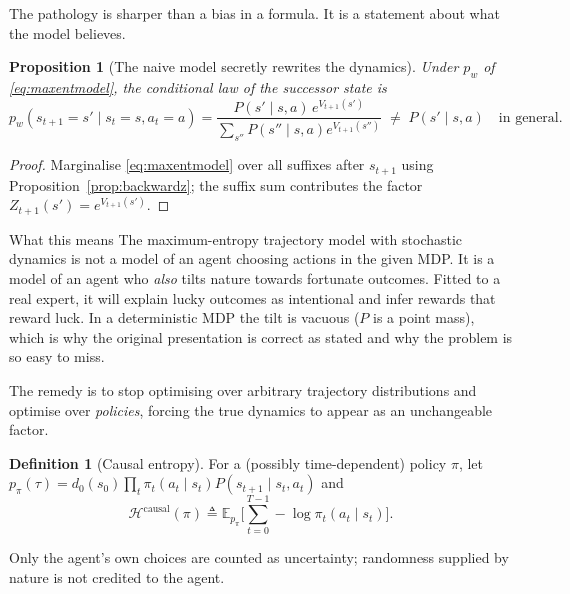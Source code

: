 \documentclass[11pt]{article}
\theoremstyle{plain}
\newtheorem{proposition}[theorem]{Proposition}
\theoremstyle{definition}
\newtheorem{definition}[theorem]{Definition}
\theoremstyle{remark}
\newcommand{\E}{\mathbb{E}}
\begin{document}
The pathology is sharper than a bias in a formula. It is a statement about
what the model believes.

\begin{proposition}[The naive model secretly rewrites the
dynamics]\label{prop:naivetrap}
Under $p_w$ of \eqref{eq:maxentmodel}, the conditional law of the
successor state is
\begin{equation}
p_w(s_{t+1}=s' \mid s_t=s, a_t=a) = \frac{P(s'\mid s,a)\,e^{V_{t+1}(s')}}
{\sum_{s''}P(s''\mid s,a)e^{V_{t+1}(s'')}} \;\ne\; P(s'\mid s,a) \quad
\text{in general.}
\label{eq:naivetrap}
\end{equation}
\end{proposition}

\begin{proof}
Marginalise \eqref{eq:maxentmodel} over all suffixes after $s_{t+1}$ using
Proposition~\ref{prop:backwardz}; the suffix sum contributes the factor
$Z_{t+1}(s') = e^{V_{t+1}(s')}$.
\end{proof}

\begin{redbox}{What this means}
The maximum-entropy trajectory model with stochastic dynamics is not a
model of an agent choosing actions in the given MDP. It is a model of an
agent who \emph{also} tilts nature towards fortunate outcomes. Fitted to a
real expert, it will explain lucky outcomes as intentional and infer
rewards that reward luck. In a deterministic MDP the tilt is vacuous ($P$
is a point mass), which is why the original presentation is correct as
stated and why the problem is so easy to miss.
\end{redbox}

The remedy is to stop optimising over arbitrary trajectory distributions
and optimise over \emph{policies}, forcing the true dynamics to appear as
an unchangeable factor.

\begin{definition}[Causal entropy]
For a (possibly time-dependent) policy $\pi$, let $p_\pi(\tau) =
d_0(s_0)\prod_t \pi_t(a_t\mid s_t)P(s_{t+1}\mid s_t,a_t)$ and
\begin{equation}
\mathcal{H}^{\mathrm{causal}}(\pi) \triangleq \E_{p_\pi}\Big[\sum_{t=0}^{T-1}
-\log \pi_t(a_t\mid s_t)\Big].
\label{eq:causalentropy}
\end{equation}
\end{definition}

Only the agent's own choices are counted as uncertainty; randomness
supplied by nature is not credited to the agent.
\end{document}

